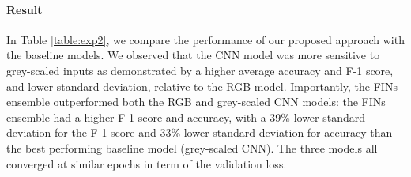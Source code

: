 \documentclass{article}
\begin{document}

\paragraph*{Result} In Table \ref{table:exp2}, we compare the performance of our proposed approach with the baseline models. We observed that the CNN model was more sensitive to grey-scaled inputs as demonstrated by a higher average accuracy and F-1 score, and lower standard deviation, relative to the RGB model. Importantly, the FINs ensemble outperformed both the RGB and grey-scaled CNN models: the FINs ensemble had a higher F-1 score and accuracy, with a 39\% lower standard deviation for the F-1 score and 33\% lower standard deviation for accuracy than the best performing baseline model (grey-scaled CNN). The three models all converged at similar epochs in term of the validation loss.

\end{document}
